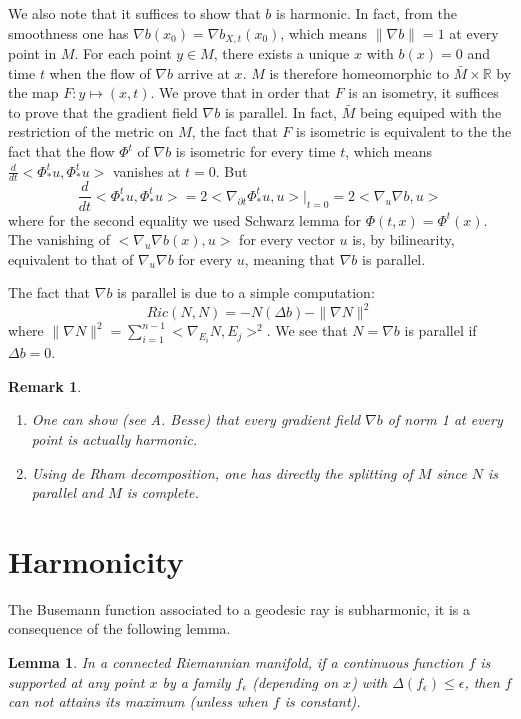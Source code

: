 \documentclass[11pt]{article}
\newtheorem{remark}{Remark}
\newtheorem{lemma}[theorem]{Lemma}
\begin{document}
We also note that it suffices to show that \(b\) is harmonic. In fact, from the smoothness one has
\(\nabla b(x_0) =\nabla b_{X,t}(x_0)\), which means \(\|\nabla b\| = 1\) at every point in \(M\). 
For each point \(y\in M\), there exists a unique \(x\) with \(b(x)=0\) and time \(t\) when the flow of
\(\nabla b\) arrive at \(x\). \(M\) is therefore homeomorphic to \(\bar M\times \mathbb{R}\) by the map
\(F: y\mapsto (x,t)\). We prove that in order that \(F\) is an isometry, it suffices to prove that the gradient field
\(\nabla b\) is parallel. In fact, \(\bar M\) being equiped with the restriction of the metric on \(M\),
the fact that \(F\) is isometric is equivalent to the the fact that the flow \(\Phi^t\) of \(\nabla b\) is
isometric for every time \(t\), which means \(\frac{d}{dt} <\Phi_*^t u, \Phi_*^t u>\) vanishes at
\(t=0\). But
\[
\frac{d}{dt}<\Phi_*^t u,\Phi_*^t u> = 2 <\nabla_{\partial t}\Phi_*^t u, u>|_{t=0} = 2<\nabla_u
\nabla b,u> 
\]
where for the second equality we used Schwarz lemma for \(\Phi(t,x) = \Phi^t(x)\). The vanishing of
\(<\nabla_u \nabla b(x),u>\) for every vector \(u\) is, by bilinearity, equivalent to that of \(\nabla_u
\nabla b\) for every \(u\), meaning that \(\nabla b\) is parallel. 

The fact that \(\nabla b\) is parallel is due to a simple computation:
\[
Ric(N,N) = -N(\Delta b) - \|\nabla N \|^2
\]
where \(\|\nabla N\|^2 = \sum_{i=1}^{n-1}<\nabla_{E_i}N, E_j>^2\). We see that \(N = \nabla b\) is parallel if \(\Delta b =0\).

\begin{remark}
\begin{enumerate}
\item One can show (see A. Besse) that every gradient field \(\nabla b\) of norm 1 at every point is actually harmonic.
\item Using de Rham decomposition, one has directly the splitting of \(M\) since \(N\) is parallel and \(M\) is complete.
\end{enumerate}
\end{remark}

\section{Harmonicity}
\label{sec:org953a134}
The Busemann function associated to a geodesic ray is subharmonic, it is a consequence of the
following lemma.


\begin{lemma}
\label{lem:1}%
In a connected Riemannian manifold, if a continuous function \(f\) is supported at any point \(x\) by
a family \(f_\epsilon\) (depending on \(x\)) with \(\Delta(f_\epsilon)\leq \epsilon\), then \(f\) can not
attains its maximum (unless when \(f\) is constant).
\end{lemma}
\end{document}
